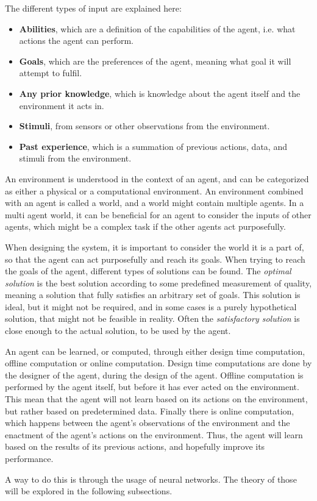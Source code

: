The different types of input are explained here:
\begin{itemize}
    \item \textbf{Abilities}, which are a definition of the capabilities of the agent, i{.}e{.} what actions the agent can perform.
    \item \textbf{Goals}, which are the preferences of the agent, meaning what goal it will attempt to fulfil.
    \item \textbf{Any prior knowledge}, which is knowledge about the agent itself and the environment it acts in.
    \item \textbf{Stimuli}, from sensors or other observations from the environment.
    \item \textbf{Past experience}, which is a summation of previous actions, data, and stimuli from the environment.
\end{itemize}


An environment is understood in the context of an agent, and can be categorized as either a physical or a computational environment.
An environment combined with an agent is called a world, and a world might contain multiple agents.
In a multi agent world, it can be beneficial for an agent to consider the inputs of other agents, which might be a complex task if the other agents act purposefully.

When designing the system, it is important to consider the world it is a part of, so that the agent can act purposefully and reach its goals.
When trying to reach the goals of the agent, different types of solutions can be found.
The \textit{optimal solution} is the best solution according to some predefined measurement of quality, meaning a solution that fully satisfies an arbitrary set of goals.
This solution is ideal, but it might not be required, and in some cases is a purely hypothetical solution, that might not be feasible in reality.
Often the \textit{satisfactory solution} is close enough to the actual solution, to be used by the agent.


An agent can be learned, or computed, through either design time computation, offline computation or online computation.
Design time computations are done by the designer of the agent, during the design of the agent.
Offline computation is performed by the agent itself, but before it has ever acted on the environment.
This mean that the agent will not learn based on its actions on the environment, but rather based on predetermined data.
Finally there is online computation, which happens between the agent's observations of the environment and the enactment of the agent's actions on the environment.
Thus, the agent will learn based on the results of its previous actions, and hopefully improve its performance.

A way to do this is through the usage of neural networks.
The theory of those will be explored in the following subsections.